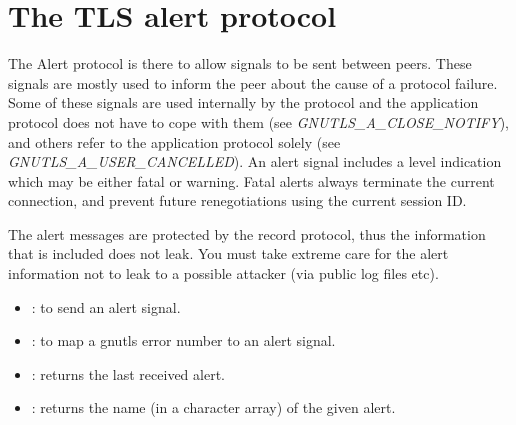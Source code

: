 \section{The TLS alert protocol}
\label{alert}

The Alert protocol
is there to allow signals to be sent between peers.
These signals are mostly used to inform the peer about the cause of
a protocol failure. Some of these signals are used internally by the
protocol and the application protocol does not have to cope with them
(see \emph{GNUTLS\_A\_CLOSE\_NOTIFY}), and others refer to the
application protocol solely (see \emph{GNUTLS\_A\_USER\_CANCELLED}).
An alert signal includes a level indication which may be either
fatal or warning. Fatal alerts always terminate the current connection,
and prevent future renegotiations using the current session ID.

\par The alert messages are protected by the record protocol, thus
the information that is included does not leak. You must take
extreme care for the alert information not to leak to a possible attacker
(via public log files etc).

\par
\begin{itemize}
\item {}:
to send an alert signal.
\item {}:
to map a gnutls error number to an alert signal.
\item {}:
returns the last received alert.
\item {}:
returns the name (in a character array) of the given alert.
\end{itemize}
